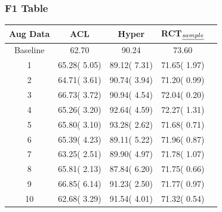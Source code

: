 \documentclass[11pt]{article}
\begin{document}
\subsubsection{F1 Table}
\label{sec:orgb98bf1e}
\begin{center}
\begin{tabular}{|c|c|c|c|c|}
\hline
Aug Data & ACL & Hyper & RCT\(_{\emph{sample}}\)\\
\hline
Baseline & 62.70 & 90.24 & 73.60\\
\hline
1 & 65.28(\textpm{} 5.05) & 89.12(\textpm{} 7.31) & 71.65(\textpm{} 1.97)\\
\hline
2 & 64.71(\textpm{} 3.61) & 90.74(\textpm{} 3.94) & 71.20(\textpm{} 0.99)\\
\hline
3 & 66.73(\textpm{} 3.72) & 90.94(\textpm{} 4.54) & 72.04(\textpm{} 0.20)\\
\hline
4 & 65.26(\textpm{} 3.20) & 92.64(\textpm{} 4.59) & 72.27(\textpm{} 1.31)\\
\hline
5 & 65.80(\textpm{} 3.10) & 93.28(\textpm{} 2.62) & 71.68(\textpm{} 0.71)\\
\hline
6 & 65.39(\textpm{} 4.23) & 89.11(\textpm{} 5.22) & 71.96(\textpm{} 0.87)\\
\hline
7 & 63.25(\textpm{} 2.51) & 89.90(\textpm{} 4.97) & 71.78(\textpm{} 1.07)\\
\hline
8 & 65.81(\textpm{} 2.13) & 87.84(\textpm{} 6.20) & 71.75(\textpm{} 0.66)\\
\hline
9 & 66.85(\textpm{} 6.14) & 91.23(\textpm{} 2.50) & 71.77(\textpm{} 0.97)\\
\hline
10 & 62.68(\textpm{} 3.29) & 91.54(\textpm{} 4.01) & 71.32(\textpm{} 0.54)\\
\hline
\end{tabular}
\end{center}
\end{document}
